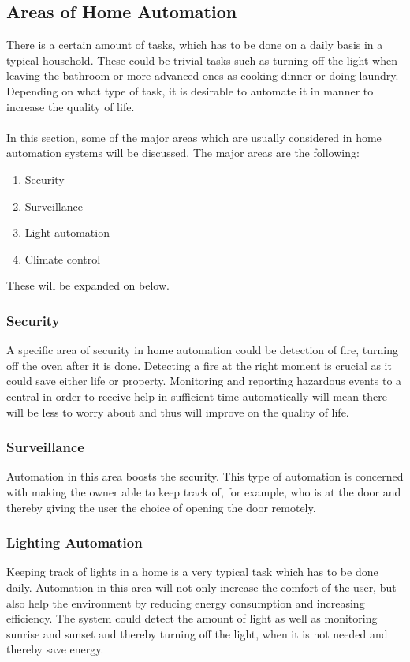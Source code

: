 \subsection{Areas of Home Automation}
\label{sec:Areas of Home Automation}
There is a certain amount of tasks, which has to be done on a daily basis in a typical household. These could be trivial tasks such as turning off the light when leaving the bathroom or more advanced ones as cooking dinner or doing laundry. Depending on what type of task, it is desirable to automate it in manner to increase the quality of life.
\\\\
In this section, some of the major areas which are usually considered in home automation systems will be discussed.
The major areas are the following:
\begin{enumerate}
  \item Security
  \item Surveillance
  \item Light automation
  \item Climate control
\end{enumerate}
These will be expanded on below.

\subsubsection{Security}
\label{sub:Security}
A specific area of security in home automation could be detection of fire, turning off the oven after it is done. Detecting a fire at the right moment is crucial as it could save either life or property. Monitoring and reporting hazardous events to a central in order to receive help in sufficient time automatically will mean there will be less to worry about and thus will improve on the quality of life.

\subsubsection{Surveillance}
\label{sub:Surveillance}
Automation in this area boosts the security. This type of automation is concerned with making the owner able to keep track of, for example, who is at the door and thereby giving the user the choice of opening the door remotely.

\subsubsection{Lighting Automation}
\label{sub:Lighting Automation}
Keeping track of lights in a home is a very typical task which has to be done daily. Automation in this area will not only increase the comfort of the user, but also help the environment by reducing energy consumption and increasing efficiency. The system could detect the amount of light as well as monitoring sunrise and sunset and thereby turning off the light, when it is not needed and thereby save energy.


